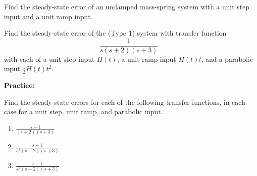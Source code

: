 \documentclass{article}
\begin{document}
\bigskip


Find the steady-state error of an undamped mass-spring system with a unit step input and a unit ramp input.

\vfill



Find the steady-state error of the (Type 1) system with transfer function
\[\frac{1}{s(s+2)(s+3)}\]
with each of a unit step input $H(t)$, a unit ramp input $H(t)t$, and a parabolic input $\frac{1}{2}H(t)t^2$.


\clearpage



\textbf{Practice:}\bigskip

Find the steady-state errors for each of the following transfer functions, in each case for a unit step, unit ramp, and parabolic input.

\begin{enumerate}
	\item $\frac{s-1}{(s+2)(s+3)}$
	\item $\frac{s-1}{s^3(s+2)(s+3)}$
	\item $\frac{s-1}{s^2(s+2)(s+3)}$
\end{enumerate}
\end{document}
